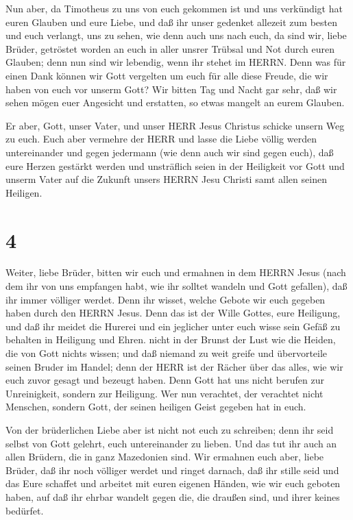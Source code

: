  Nun aber, da Timotheus zu uns von euch gekommen ist und uns
verkündigt hat euren Glauben und eure Liebe, und daß ihr unser gedenket
allezeit zum besten und euch verlangt, uns zu sehen, wie denn auch uns
nach euch,  da sind wir, liebe Brüder, getröstet worden an
euch in aller unsrer Trübsal und Not durch euren Glauben; 
denn nun sind wir lebendig, wenn ihr stehet im HERRN.  Denn
was für einen Dank können wir Gott vergelten um euch für alle diese
Freude, die wir haben von euch vor unserm Gott?  Wir bitten
Tag und Nacht gar sehr, daß wir sehen mögen euer Angesicht und
erstatten, so etwas mangelt an eurem Glauben.

 Er aber, Gott, unser Vater, und unser HERR Jesus Christus
schicke unsern Weg zu euch.  Euch aber vermehre der HERR
und lasse die Liebe völlig werden untereinander und gegen jedermann (wie
denn auch wir sind gegen euch),  daß eure Herzen gestärkt
werden und unsträflich seien in der Heiligkeit vor Gott und unserm Vater
auf die Zukunft unsers HERRN Jesu Christi samt allen seinen Heiligen.

\hypertarget{section-3}{%
\section{4}\label{section-3}}

 Weiter, liebe Brüder, bitten wir euch und ermahnen in dem
HERRN Jesus (nach dem ihr von uns empfangen habt, wie ihr solltet
wandeln und Gott gefallen), daß ihr immer völliger werdet. 
Denn ihr wisset, welche Gebote wir euch gegeben haben durch den HERRN
Jesus.  Denn das ist der Wille Gottes, eure Heiligung, und
daß ihr meidet die Hurerei  und ein jeglicher unter euch
wisse sein Gefäß zu behalten in Heiligung und Ehren.  nicht
in der Brunst der Lust wie die Heiden, die von Gott nichts wissen;
 und daß niemand zu weit greife und übervorteile seinen
Bruder im Handel; denn der HERR ist der Rächer über das alles, wie wir
euch zuvor gesagt und bezeugt haben.  Denn Gott hat uns
nicht berufen zur Unreinigkeit, sondern zur Heiligung.  Wer
nun verachtet, der verachtet nicht Menschen, sondern Gott, der seinen
heiligen Geist gegeben hat in euch.

 Von der brüderlichen Liebe aber ist nicht not euch zu
schreiben; denn ihr seid selbst von Gott gelehrt, euch untereinander zu
lieben.  Und das tut ihr auch an allen Brüdern, die in ganz
Mazedonien sind. Wir ermahnen euch aber, liebe Brüder, daß ihr noch
völliger werdet  und ringet darnach, daß ihr stille seid
und das Eure schaffet und arbeitet mit euren eigenen Händen, wie wir
euch geboten haben,  auf daß ihr ehrbar wandelt gegen die,
die draußen sind, und ihrer keines bedürfet.

